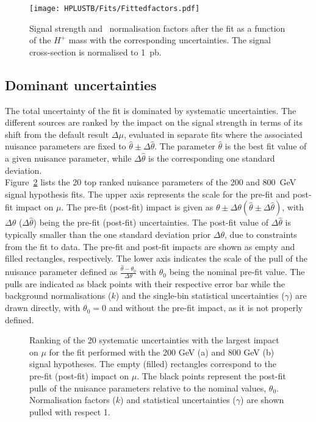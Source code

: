 \begin{figure}[htb]
    \RawFloats
    \centering
    \texttt{[image: HPLUSTB/Fits/Fittedfactors.pdf]}
    \caption{Signal strength and \ttHF\ normalisation factors after the fit as a function of the $H^+$ mass with the corresponding uncertainties. The signal cross-section is normalised to 1~pb.   
    }
    \label{Hplustb:fittedfactorsvsmass}
\end{figure}


\subsection{Dominant uncertainties}

The total uncertainty of the fit is dominated by systematic uncertainties. The different sources are ranked by the impact on the signal strength in terms of its shift from the default result $\Delta\mu$, evaluated in separate fits where the associated nuisance parameters are fixed to $\hat{\theta}\pm\Delta\hat{\theta}$. The parameter $\hat{\theta}$ is the best fit value of a given nuisance parameter, while $\Delta\hat{\theta}$ is the corresponding one standard deviation.\\

Figure~\ref{Hplustb:ranking200800} lists the 20 top ranked nuisance parameters of the 200 and 800~GeV signal hypothesis fits. The upper axis represents the scale for the pre-fit and post-fit impact on $\mu$. The pre-fit (post-fit) impact is given as $\theta \pm \Delta\theta (\hat{\theta} \pm \Delta\hat{\theta})$, with $\Delta\theta$ ($\Delta\hat{\theta}$) being the pre-fit (post-fit) uncertainties. The post-fit value of $\Delta\hat{\theta}$ is typically smaller than the one standard deviation prior $\Delta\theta$, due to constraints from the fit to data. The pre-fit and post-fit impacts are shown as empty and filled rectangles, respectively. The lower axis indicates the scale of the pull of the nuisance parameter defined as $\frac{\hat{\theta} -\theta_0}{\Delta\theta}$ with $\theta_0$ being the nominal pre-fit value. The pulls are indicated as black points with their respective error bar while the background normalisations ($k$) and the single-bin statistical uncertainties ($\gamma$) are drawn directly, with $\theta_0=0$ and without the pre-fit impact, as it is not properly defined.\\

\begin{figure}[tb]
    \RawFloats
    \centering
    \caption{Ranking of the 20 systematic uncertainties with the largest impact on $\mu$ for the fit performed with the 200 GeV (a) and 800 GeV (b) signal hypotheses. The empty (filled) rectangles correspond
    to the pre-fit (post-fit) impact on $\mu$. The black points represent the post-fit pulls of the nuisance parameters relative to the nominal values, $\theta_0$. Normalisation factors ($k$) and statistical uncertainties ($\gamma$) are shown pulled with respect 1.
    }
    \label{Hplustb:ranking200800}
\end{figure}

